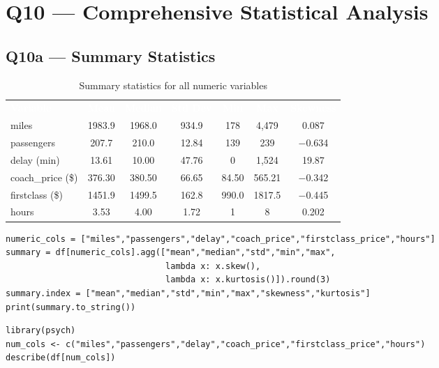 \documentclass[12pt, a4paper]{report}
\newcommand{\thead}[1]{\cellcolor{themeHeaderBg}\textcolor{white}{\textbf{#1}}}
\newcommand{\talt}{\rowcolor{themeRowAlt}}
\newcommand{\trow}{\rowcolor{white}}
\begin{document}
\chapter{Q10 — Comprehensive Statistical Analysis}

\section{Q10a — Summary Statistics}

\begin{table}[H]
\centering
\renewcommand{\arraystretch}{1.3}
\begin{tabular}{lcccccc}
\thead{Variable} & \thead{Mean} & \thead{Median} & \thead{Std Dev} & \thead{Min} & \thead{Max} & \thead{Skewness} \\
\talt miles            & 1983.9 & 1968.0 & 934.9  & 178   & 4,479  & 0.087 \\
\trow passengers       & 207.7  & 210.0  & 12.84  & 139   & 239    & $-$0.634 \\
\talt delay (min)      & 13.61  & 10.00  & 47.76  & 0     & 1,524  & 19.87 \\
\trow coach\_price (\$) & 376.30 & 380.50 & 66.65  & 84.50 & 565.21 & $-$0.342 \\
\talt firstclass (\$)  & 1451.9 & 1499.5 & 162.8  & 990.0 & 1817.5 & $-$0.445 \\
\trow hours            & 3.53   & 4.00   & 1.72   & 1     & 8      & 0.202 \\
\end{tabular}
\caption{Summary statistics for all numeric variables}
\end{table}

\begin{lstlisting}[style=python, caption={Python — Comprehensive summary statistics}]
numeric_cols = ["miles","passengers","delay","coach_price","firstclass_price","hours"]
summary = df[numeric_cols].agg(["mean","median","std","min","max",
                                lambda x: x.skew(),
                                lambda x: x.kurtosis()]).round(3)
summary.index = ["mean","median","std","min","max","skewness","kurtosis"]
print(summary.to_string())
\end{lstlisting}

\begin{lstlisting}[style=Rcode, caption={R — Comprehensive summary statistics}]
library(psych)
num_cols <- c("miles","passengers","delay","coach_price","firstclass_price","hours")
describe(df[num_cols])
\end{lstlisting}
\end{document}
